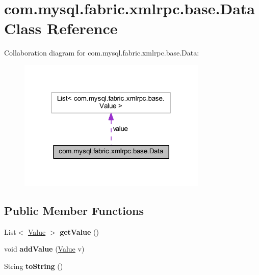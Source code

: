 \hypertarget{classcom_1_1mysql_1_1fabric_1_1xmlrpc_1_1base_1_1_data}{}\section{com.\+mysql.\+fabric.\+xmlrpc.\+base.\+Data Class Reference}
\label{classcom_1_1mysql_1_1fabric_1_1xmlrpc_1_1base_1_1_data}


Collaboration diagram for com.\+mysql.\+fabric.\+xmlrpc.\+base.\+Data\+:\nopagebreak
\begin{figure}[H]
\begin{center}
\leavevmode
\includegraphics[width=255pt]{classcom_1_1mysql_1_1fabric_1_1xmlrpc_1_1base_1_1_data__coll__graph}
\end{center}
\end{figure}
\subsection*{Public Member Functions}
\begin{DoxyCompactItemize}
\item 
\mbox{\label{classcom_1_1mysql_1_1fabric_1_1xmlrpc_1_1base_1_1_data_aa344a6a6d6019a86985e5a6a7eb508ed}} 
List$<$ \mbox{\hyperlink{classcom_1_1mysql_1_1fabric_1_1xmlrpc_1_1base_1_1_value}{Value}} $>$ {\bfseries get\+Value} ()
\item 
\mbox{\label{classcom_1_1mysql_1_1fabric_1_1xmlrpc_1_1base_1_1_data_a2d2741f1607e74e898d38ff3f44a6e98}} 
void {\bfseries add\+Value} (\mbox{\hyperlink{classcom_1_1mysql_1_1fabric_1_1xmlrpc_1_1base_1_1_value}{Value}} v)
\item 
\mbox{\label{classcom_1_1mysql_1_1fabric_1_1xmlrpc_1_1base_1_1_data_a3b5857c13b4a42e34aa3ccde998f29c7}} 
String {\bfseries to\+String} ()
\end{DoxyCompactItemize}
